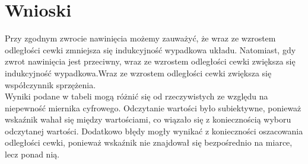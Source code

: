 \documentclass[a4paper,10pt,twoside]{article}
\begin{document}
	\begin{figure}[H]
	\end{figure}
 \newpage

	\section{Wnioski}

Przy zgodnym zwrocie nawinięcia możemy zauważyć, że wraz ze wzrostem odległości cewki zmniejsza się indukcyjność wypadkowa układu. Natomiast, gdy zwrot nawinięcia jest przeciwny, wraz ze wzrostem odległości cewki zwiększa się indukcyjność wypadkowa.Wraz ze wzrostem odległości cewki zwiększa się współczynnik sprzężenia.\\
Wyniki podane w tabeli mogą różnić się od rzeczywistych ze względu na niepewność miernika cyfrowego. Odczytanie wartości było subiektywne, ponieważ wskaźnik wahał się między wartościami, co wiązało się z koniecznością wyboru odczytanej wartości. Dodatkowo błędy mogły wynikać z konieczności oszacowania odległości cewki, ponieważ wskaźnik nie znajdował się bezpośrednio na miarce, lecz ponad nią.
\end{document}
